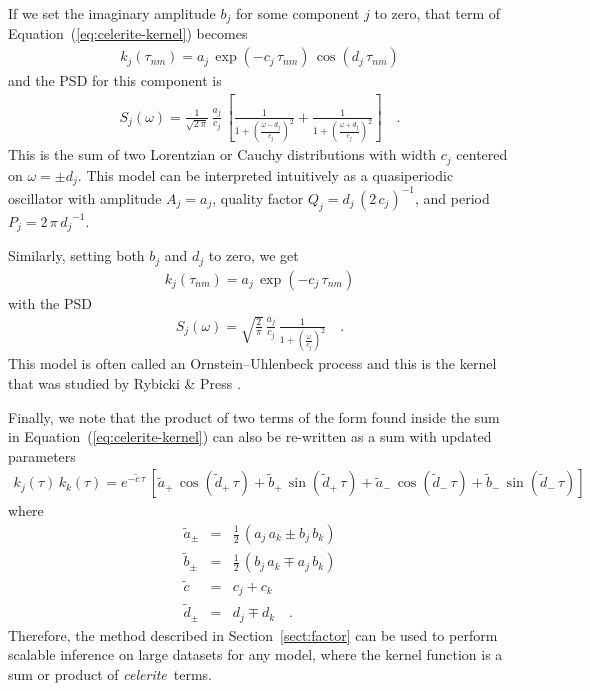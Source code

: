 \documentclass[manuscript, letterpaper]{aastex6}
\newcommand{\celeriteterm}{\emph{celerite}}
\renewcommand{\eqref}[1]{\ref{eq:#1}}
\newcommand{\Eq}[1]{Equation~(\eqref{#1})}
\newcommand{\eq}[1]{\Eq{#1}}
\newcommand{\eqlabel}[1]{\label{eq:#1}}
\newcommand{\sectionname}{Section}
\newcommand{\sectref}[1]{\ref{sect:#1}}
\newcommand{\Sect}[1]{\sectionname~\sectref{#1}}
\newcommand{\sect}[1]{\Sect{#1}}
\newcommand{\response}[1]{{\color{blue}#1}}
\begin{document}
If we set the imaginary amplitude $b_j$ for some component $j$ to zero, that
term of \eq{celerite-kernel} becomes
\begin{eqnarray}
k_j(\tau_{nm}) =
    a_j\,\exp\left(-c_j\,\tau_{nm}\right)\,\cos\left(d_j\,\tau_{nm}\right)
\end{eqnarray}
and the PSD for this component is
\begin{eqnarray}\eqlabel{lorentz-psd}
S_j(\omega) = \frac{1}{\sqrt{2\,\pi}}\,\frac{a_j}{c_j}\,\left[
    \frac{1}{1+{\left(\frac{\omega-d_j}{c_j}\right)}^2} +
    \frac{1}{1+{\left(\frac{\omega+d_j}{c_j}\right)}^2}
\right] \quad.
\end{eqnarray}
This is the sum of two Lorentzian or Cauchy distributions with width $c_j$
centered on $\omega = \pm d_j$.
This model can be interpreted intuitively as a quasiperiodic oscillator with
amplitude $A_j = a_j$, quality factor $Q_j = d_j\,{(2\,c_j)}^{-1}$, and period
$P_j = 2\,\pi\,{d_j}^{-1}$.

Similarly, setting both $b_j$ and $d_j$ to zero, we get
\begin{eqnarray}
k_j(\tau_{nm}) = a_j\,\exp\left(-c_j\,\tau_{nm}\right)
\end{eqnarray}
with the PSD
\begin{eqnarray}
S_j(\omega) = \sqrt{\frac{2}{\pi}}\,\frac{a_j}{c_j}\,
    \frac{1}{1+{\left(\frac{\omega}{c_j}\right)}^2} \quad.
\end{eqnarray}
This model is often called an Ornstein--Uhlenbeck process \response{\citep[in
reference to the classic paper,][]{Uhlenbeck:1930}} and this is the kernel
that was studied by Rybicki \& Press \citep{Rybicki:1992,Rybicki:1995}.

Finally, we note that the product of two terms of the form found inside the
sum in \eq{celerite-kernel} can also be re-written as a sum with updated
parameters
\begin{eqnarray}\eqlabel{product-rule}
k_j(\tau) \, k_k(\tau) =
    e^{-\tilde{c}\,\tau}\,[
        \tilde{a}_+\,\cos(\tilde{d}_+\,\tau) + \tilde{b}_+\,\sin(\tilde{d}_+\,\tau) +
        \tilde{a}_-\,\cos(\tilde{d}_-\,\tau) + \tilde{b}_-\,\sin(\tilde{d}_-\,\tau)
    ]
\end{eqnarray}
where
\begin{eqnarray}
    \tilde{a}_{\pm} &=& \frac{1}{2}\,(a_j\,a_k \pm b_j\,b_k) \\
    \tilde{b}_{\pm} &=& \frac{1}{2}\,(b_j\,a_k \mp a_j\,b_k) \\
    \tilde{c} &=& c_j + c_k \\
    \tilde{d}_{\pm} &=& d_j \mp d_k \quad.
\end{eqnarray}
Therefore, the method described in \sect{factor} can be used to
perform scalable inference on large datasets for any model, where the kernel
function is a sum or product of \celeriteterm\ terms.
\end{document}
